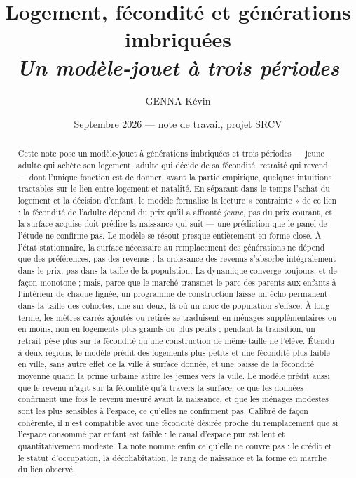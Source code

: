\documentclass[11pt,a4paper]{article}
\title{\color{brandnavy}Logement, fécondité et générations imbriquées\\[0.3em]
{\large\itshape Un modèle-jouet à trois périodes}}
\author{GENNA Kévin}
\date{Septembre 2026 — note de travail, projet SRCV}
\theoremstyle{plain}
\theoremstyle{definition}
\begin{document}
\maketitle

\begin{abstract}
Cette note pose un modèle-jouet à générations imbriquées et trois périodes — jeune adulte qui achète son logement, adulte qui décide de sa fécondité, retraité qui revend — dont l'unique fonction est de donner, avant la partie empirique, quelques intuitions tractables sur le lien entre logement et natalité. En séparant dans le temps l'achat du logement et la décision d'enfant, le modèle formalise la lecture « contrainte » de ce lien : la fécondité de l'adulte dépend du prix qu'il a affronté \emph{jeune}, pas du prix courant, et la surface acquise doit prédire la naissance qui suit — une prédiction que le panel de l'étude ne confirme pas. Le modèle se résout presque entièrement en forme close. À l'état stationnaire, la surface nécessaire au remplacement des générations ne dépend que des préférences, pas des revenus : la croissance des revenus s'absorbe intégralement dans le prix, pas dans la taille de la population. La dynamique converge toujours, et de façon monotone ; mais, parce que le marché transmet le parc des parents aux enfants à l'intérieur de chaque lignée, un programme de construction laisse un écho permanent dans la taille des cohortes, une sur deux, là où un choc de population s'efface. À long terme, les mètres carrés ajoutés ou retirés se traduisent en ménages supplémentaires ou en moins, non en logements plus grands ou plus petits ; pendant la transition, un retrait pèse plus sur la fécondité qu'une construction de même taille ne l'élève. Étendu à deux régions, le modèle prédit des logements plus petits et une fécondité plus faible en ville, sans autre effet de la ville à surface donnée, et une baisse de la fécondité moyenne quand la prime urbaine attire les jeunes vers la ville. Le modèle prédit aussi que le revenu n'agit sur la fécondité qu'à travers la surface, ce que les données confirment une fois le revenu mesuré avant la naissance, et que les ménages modestes sont les plus sensibles à l'espace, ce qu'elles ne confirment pas. Calibré de façon cohérente, il n'est compatible avec une fécondité désirée proche du remplacement que si l'espace consommé par enfant est faible : le canal d'espace pur est lent et quantitativement modeste. La note nomme enfin ce qu'elle ne couvre pas : le crédit et le statut d'occupation, la décohabitation, le rang de naissance et la forme en marche du lien observé.
\end{abstract}
\end{document}
